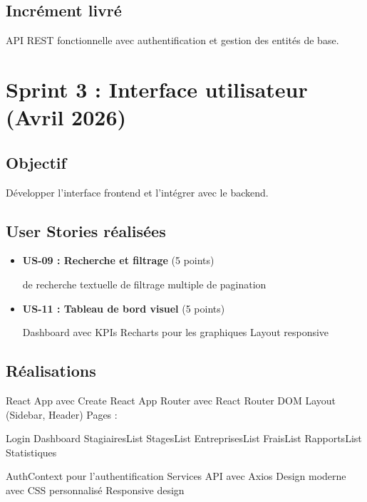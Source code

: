 \documentclass[12pt,a4paper]{report}
\begin{document}
\subsection*{Incrément livré}
API REST fonctionnelle avec authentification et gestion des entités de base.

\section*{Sprint 3 : Interface utilisateur (Avril 2026)}

\subsection*{Objectif}
Développer l'interface frontend et l'intégrer avec le backend.

\subsection*{User Stories réalisées}

\begin{itemize}[leftmargin=1cm]
    \item \textbf{US-09 : Recherche et filtrage} (5 points)
    \begin{itemize}
        \composants de recherche textuelle
        \composants de filtrage multiple
        \composants de pagination
    \end{itemize}
    
    \item \textbf{US-11 : Tableau de bord visuel} (5 points)
    \begin{itemize}
        \composants Dashboard avec KPIs
        \composants Recharts pour les graphiques
        \composants Layout responsive
    \end{itemize}
\end{itemize}

\subsection*{Réalisations}

\begin{itemize}[leftmargin=1cm]
    \composants React App avec Create React App
    \composants Router avec React Router DOM
    \composants Layout (Sidebar, Header)
    \composants Pages :
    \begin{itemize}
        \composants Login
        \composants Dashboard
        \composants StagiairesList
        \composants StagesList
        \composants EntreprisesList
        \composants FraisList
        \composants RapportsList
        \composants Statistiques
    \end{itemize}
    \composants AuthContext pour l'authentification
    \composants Services API avec Axios
    \composants Design moderne avec CSS personnalisé
    \composants Responsive design
\end{itemize}
\end{document}
